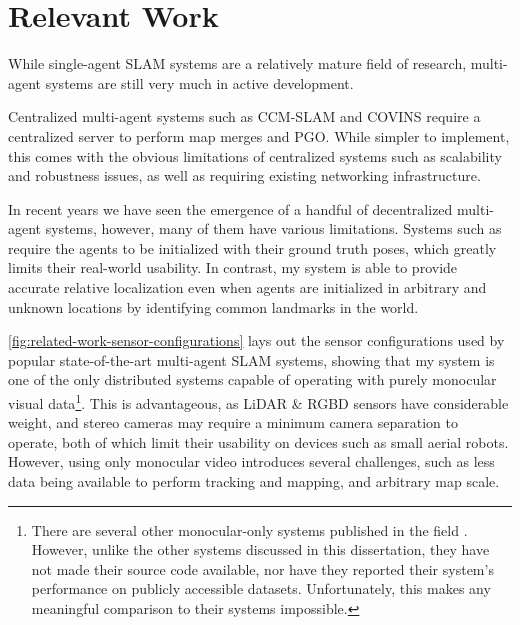 \section{Relevant Work}
\label{sec:relevant-work}
While single-agent SLAM systems are a relatively mature field of research, multi-agent systems are still very much in active development.

Centralized multi-agent systems such as CCM-SLAM \autocite{schmuck2019ccm} and COVINS \autocite{schmuck2021covins} require a centralized server to perform map merges and PGO. While simpler to implement, this comes with the obvious limitations of centralized systems such as scalability and robustness issues, as well as requiring existing networking infrastructure.

In recent years we have seen the emergence of a handful of decentralized multi-agent systems, however, many of them have various limitations. Systems such as \autocite{doi:10.1126/scirobotics.abm5954} \autocite{8658783} \autocite{DBLP:journals/corr/abs-2103-12770} require the agents to be initialized with their ground truth poses, which greatly limits their real-world usability. In contrast, my system is able to provide accurate relative localization even when agents are initialized in arbitrary and unknown locations by identifying common landmarks in the world.

\autoref{fig:related-work-sensor-configurations} lays out the sensor configurations used by popular state-of-the-art multi-agent SLAM systems, showing that my system is one of the only distributed systems capable of operating with purely monocular visual data\footnote[1]{There are several other monocular-only systems published in the field \autocite{egodagamage2017collaborative} \autocite{chen2018distributed} \autocite{bresson2012real}. However, unlike the other systems discussed in this dissertation, they have not made their source code available, nor have they reported their system's performance on publicly accessible datasets. Unfortunately, this makes any meaningful comparison to their systems impossible.}. This is advantageous, as LiDAR \& RGBD sensors have considerable weight, and stereo cameras may require a minimum camera separation to operate, both of which limit their usability on devices such as small aerial robots. However, using only monocular video introduces several challenges, such as less data being available to perform tracking and mapping, and arbitrary map scale.

